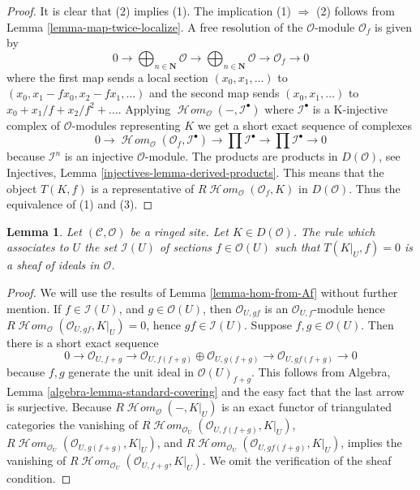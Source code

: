 \documentclass{stacks-project}
\theoremstyle{plain}
\newtheorem{lemma}[subsection]{Lemma}
\theoremstyle{definition}
\theoremstyle{remark}
\numberwithin{equation}{subsection}
\def\SheafHom{\mathop{\mathcal{H}\!\mathit{om}}\nolimits}
\begin{document}
\begin{proof}
It is clear that (2) implies (1). The implication (1) $\Rightarrow$ (2)
follows from Lemma \ref{lemma-map-twice-localize}.
A free resolution of the $\mathcal{O}$-module $\mathcal{O}_f$ is given by
$$
0 \to \bigoplus\nolimits_{n \in \mathbf{N}} \mathcal{O} \to
\bigoplus\nolimits_{n \in \mathbf{N}} \mathcal{O}
\to \mathcal{O}_f \to 0
$$
where the first map sends a local section $(x_0, x_1, \ldots)$ to
$(x_0, x_1 - fx_0, x_2 - fx_1, \ldots)$ and the second map sends
$(x_0, x_1, \ldots)$ to $x_0 + x_1/f + x_2/f^2 + \ldots$.
Applying $\SheafHom_\mathcal{O}(-, \mathcal{I}^\bullet)$
where $\mathcal{I}^\bullet$ is a K-injective complex of $\mathcal{O}$-modules
representing $K$ we get a short exact sequence of complexes
$$
0 \to \SheafHom_\mathcal{O}(\mathcal{O}_f, \mathcal{I}^\bullet) \to
\prod \mathcal{I}^\bullet \to \prod \mathcal{I}^\bullet \to 0
$$
because $\mathcal{I}^n$ is an injective $\mathcal{O}$-module.
The products are products in $D(\mathcal{O})$, see
Injectives, Lemma \ref{injectives-lemma-derived-products}.
This means that the object $T(K, f)$ is a representative of
$R\SheafHom_\mathcal{O}(\mathcal{O}_f, K)$ in $D(\mathcal{O})$.
Thus the equivalence of (1) and (3).
\end{proof}

\begin{lemma}
\label{lemma-ideal-of-elements-complete-wrt}
Let $(\mathcal{C}, \mathcal{O})$ be a ringed site. Let $K \in D(\mathcal{O})$.
The rule which associates to $U$ the set $\mathcal{I}(U)$
of sections $f \in \mathcal{O}(U)$ such that $T(K|_U, f) = 0$
is a sheaf of ideals in $\mathcal{O}$.
\end{lemma}

\begin{proof}
We will use the results of Lemma \ref{lemma-hom-from-Af} without further
mention. If $f \in \mathcal{I}(U)$, and $g \in \mathcal{O}(U)$, then
$\mathcal{O}_{U, gf}$ is an $\mathcal{O}_{U, f}$-module
hence $R\SheafHom_\mathcal{O}(\mathcal{O}_{U, gf}, K|_U) = 0$, hence
$gf \in \mathcal{I}(U)$. Suppose $f, g \in \mathcal{O}(U)$.
Then there is a short exact sequence
$$
0 \to \mathcal{O}_{U, f + g} \to
\mathcal{O}_{U, f(f + g)} \oplus \mathcal{O}_{U, g(f + g)} \to
\mathcal{O}_{U, gf(f + g)} \to 0
$$
because $f, g$ generate the unit ideal in $\mathcal{O}(U)_{f + g}$.
This follows from
Algebra, Lemma \ref{algebra-lemma-standard-covering}
and the easy fact that the last arrow is surjective.
Because $R\SheafHom_\mathcal{O}( - , K|_U)$ is an exact functor
of triangulated categories the vanishing of
$R\SheafHom_{\mathcal{O}_U}(\mathcal{O}_{U, f(f + g)}, K|_U)$,
$R\SheafHom_{\mathcal{O}_U}(\mathcal{O}_{U, g(f + g)}, K|_U)$, and
$R\SheafHom_{\mathcal{O}_U}(\mathcal{O}_{U, gf(f + g)}, K|_U)$,
implies the vanishing of 
$R\SheafHom_{\mathcal{O}_U}(\mathcal{O}_{U, f + g}, K|_U)$.
We omit the verification of the sheaf condition.
\end{proof}
\end{document}
